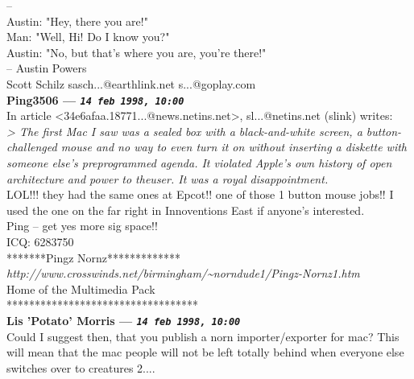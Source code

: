 \documentclass[11pt,twoside,a4paper]{article}
\begin{document}
\begin{multicols*}{2}
-- ~\\
Austin: "Hey, there you are!"~\\
Man: "Well, Hi! Do I know you?"~\\
Austin: "No, but that's where you are, you're there!"~\\
-- Austin Powers~\\

Scott Schilz    sasch...@earthlink.net         s...@goplay.com~\\

 
		
	
		
\textbf{Ping3506 --- \emph{\texttt{14 feb 1998, 10:00}}}~\\

In article <34e6afaa.18771...@news.netins.net>, sl...@netins.net (slink) writes:~\\

\emph{> The first Mac I saw was a sealed box with a black-and-white screen, a button-challenged mouse and no way to even turn it on without inserting a diskette with someone else's preprogrammed agenda.  It violated Apple's own history of open architecture and power to theuser.  It was a royal disappointment.}~\\

LOL!!! they had the same ones at Epcot!! one of those 1 button mouse jobs!! I used the one on the far right in Innoventions East if anyone's interested.~\\

Ping -- get yes more sig space!!~\\
ICQ:  6283750~\\
*******Pingz Nornz*************~\\
\emph{http://www.crosswinds.net/birmingham/\textasciitilde norndude1/Pingz-Nornz1.htm}~\\
Home of the Multimedia Pack~\\
**********************************~\\

 
		
	
		
\textbf{Lis 'Potato' Morris --- \emph{\texttt{14 feb 1998, 10:00}}}~\\

Could I suggest then, that you publish a norn importer/exporter for mac? This will mean that the mac people will not be left totally behind when everyone else switches over to creatures 2....~\\





\end{multicols*}
\end{document}
